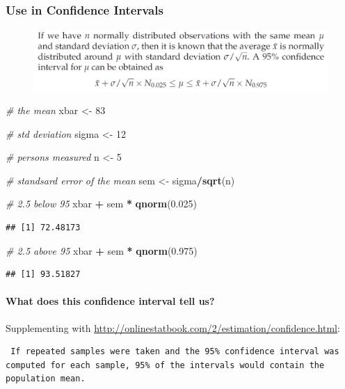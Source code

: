 \documentclass[]{article}
\newenvironment{Shaded}{\begin{snugshade}}{\end{snugshade}}
\newcommand{\KeywordTok}[1]{\textcolor[rgb]{0.13,0.29,0.53}{\textbf{#1}}}
\newcommand{\DecValTok}[1]{\textcolor[rgb]{0.00,0.00,0.81}{#1}}
\newcommand{\FloatTok}[1]{\textcolor[rgb]{0.00,0.00,0.81}{#1}}
\newcommand{\StringTok}[1]{\textcolor[rgb]{0.31,0.60,0.02}{#1}}
\newcommand{\CommentTok}[1]{\textcolor[rgb]{0.56,0.35,0.01}{\textit{#1}}}
\newcommand{\OperatorTok}[1]{\textcolor[rgb]{0.81,0.36,0.00}{\textbf{#1}}}
\newcommand{\NormalTok}[1]{#1}
\let\oldparagraph\paragraph
\renewcommand{\paragraph}[1]{\oldparagraph{#1}\mbox{}}
\begin{document}
\subsubsection{Use in Confidence
Intervals}\label{use-in-confidence-intervals}

\begin{figure}
\centering
\includegraphics{img/95ci.png}
\caption{}
\end{figure}

\begin{Shaded}
\begin{Highlighting}[]
\CommentTok{# the mean}
\NormalTok{xbar <-}\StringTok{ }\DecValTok{83}

\CommentTok{# std deviation}
\NormalTok{sigma <-}\StringTok{ }\DecValTok{12}

\CommentTok{# persons measured}
\NormalTok{n <-}\StringTok{ }\DecValTok{5}

\CommentTok{# standsard error of the mean}
\NormalTok{sem <-}\StringTok{ }\NormalTok{sigma}\OperatorTok{/}\KeywordTok{sqrt}\NormalTok{(n)}

\CommentTok{# 2.5 below 95}
\NormalTok{xbar }\OperatorTok{+}\StringTok{ }\NormalTok{sem }\OperatorTok{*}\StringTok{ }\KeywordTok{qnorm}\NormalTok{(}\FloatTok{0.025}\NormalTok{)}
\end{Highlighting}
\end{Shaded}

\begin{verbatim}
## [1] 72.48173
\end{verbatim}

\begin{Shaded}
\begin{Highlighting}[]
\CommentTok{# 2.5 above 95}
\NormalTok{xbar }\OperatorTok{+}\StringTok{ }\NormalTok{sem }\OperatorTok{*}\StringTok{ }\KeywordTok{qnorm}\NormalTok{(}\FloatTok{0.975}\NormalTok{)}
\end{Highlighting}
\end{Shaded}

\begin{verbatim}
## [1] 93.51827
\end{verbatim}

\paragraph{What does this confidence interval tell
us?}\label{what-does-this-confidence-interval-tell-us}

Supplementing with
\url{http://onlinestatbook.com/2/estimation/confidence.html}:

\begin{verbatim}
 If repeated samples were taken and the 95% confidence interval was computed for each sample, 95% of the intervals would contain the population mean.
\end{verbatim}
\end{document}
